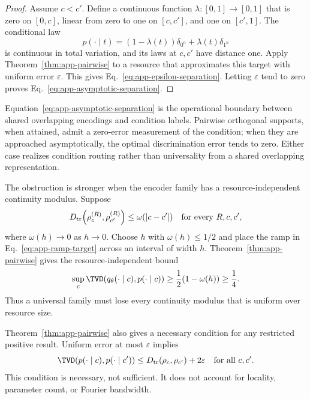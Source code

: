 \begin{proof}
Assume $c<c'$. Define a continuous function
$\lambda:[0,1]\to[0,1]$ that is zero on $[0,c]$, linear from zero to one on
$[c,c']$, and one on $[c',1]$. The conditional law
\begin{equation}
 p(\cdot\mid t)
 =(1-\lambda(t))\delta_{0^n}+\lambda(t)\delta_{1^n}
 \label{eq:app-ramp-target}
\end{equation}
is continuous in total variation, and its laws at $c,c'$ have distance one.
Apply Theorem~\ref{thm:app-pairwise} to a resource that approximates this
target with uniform error $\varepsilon$. This gives
Eq.~\eqref{eq:app-epsilon-separation}. Letting $\varepsilon$ tend to zero
proves Eq.~\eqref{eq:app-asymptotic-separation}.
\end{proof}

Equation~\eqref{eq:app-asymptotic-separation} is the operational boundary
between shared overlapping encodings and condition labels. Pairwise
orthogonal supports, when attained, admit a zero-error measurement of the
condition; when they are approached asymptotically, the optimal
discrimination error tends to zero. Either case realizes condition routing
rather than universality from a shared overlapping representation.

The obstruction is stronger when the encoder family has a
resource-independent continuity modulus. Suppose
\begin{equation}
 D_{\rm tr}\!\left(\rho_c^{(R)},\rho_{c'}^{(R)}\right)
 \leq\omega(|c-c'|)
 \quad\text{for every }R,c,c',
 \label{eq:app-uniform-modulus}
\end{equation}
where $\omega(h)\to0$ as $h\to0$. Choose $h$ with $\omega(h)\leq1/2$ and
place the ramp in Eq.~\eqref{eq:app-ramp-target} across an interval of width
$h$. Theorem~\ref{thm:app-pairwise} gives the resource-independent bound
\begin{equation}
 \sup_c\TVD\!\left(q_\theta(\cdot\mid c),p(\cdot\mid c)\right)
 \geq\frac12(1-\omega(h))\geq\frac14.
 \label{eq:app-equicontinuous-bound}
\end{equation}
Thus a universal family must lose every continuity modulus that is uniform
over resource size.

Theorem~\ref{thm:app-pairwise} also gives a necessary condition for any
restricted positive result. Uniform error at most $\varepsilon$ implies
\begin{equation}
 \TVD\!\left(p(\cdot\mid c),p(\cdot\mid c')\right)
 \leq D_{\rm tr}(\rho_c,\rho_{c'})+2\varepsilon
 \quad\text{for all }c,c'.
 \label{eq:app-compatible-kernel}
\end{equation}
This condition is necessary, not sufficient. It does not account for
locality, parameter count, or Fourier bandwidth.


